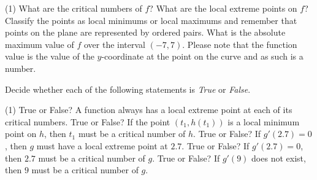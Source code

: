 \documentclass[12pt,]{book}
\theoremstyle{plain}
\theoremstyle{definition}
\numberwithin{equation}{section}
\newcounter{figstack}
\newcounter{figindex}
\newlength\fight
\newcommand\pushValignCaptionBottom[5][b]{%
\stepcounter{figstack}%
\expandafter\def\csname %
figalign\romannumeral\value{figstack}\endcsname{#1}%
\expandafter\def\csname %
figtype\romannumeral\value{figstack}\endcsname{#2}%
\expandafter\def\csname %
figwd\romannumeral\value{figstack}\endcsname{#3}%
\expandafter\def\csname %
figcontent\romannumeral\value{figstack}\endcsname{#4}%
\expandafter\def\csname %
figcap\romannumeral\value{figstack}\endcsname{#5}%
\setbox0=\hbox{%
\begin{#2}{#3}#4\end{#2}}%
\ifdim\dimexpr\ht0+\dp0\relax>\fight\global\setlength{\fight}{%
\dimexpr\ht0+\dp0\relax}\fi%
}
\newcommand\popValignCaptionBottom{%
\setcounter{figindex}{0}%
\hfill%
\whiledo{\value{figindex}<\value{figstack}}{%
\stepcounter{figindex}%
\def\tmp{\csname figwd\romannumeral\value{figindex}\endcsname}%
\begin{\csname figtype\romannumeral\value{figindex}\endcsname}[t]{\tmp}%
\centering%
\stackinset{c}{}%
{\csname figalign\romannumeral\value{figindex}\endcsname}{}%
{\csname figcontent\romannumeral\value{figindex}\endcsname}%
{\rule{0pt}{\fight}}\par%
\csname figcap\romannumeral\value{figindex}\endcsname%
\end{\csname figtype\romannumeral\value{figindex}\endcsname}%
\hfill%
}%
\setcounter{figstack}{0}%
\setlength{\fight}{0pt}%
\hfill%
}
\newcommand{\fe}[2]{#1\mathopen{}\left(#2\right)\mathclose{}}
\newcommand{\ointerval}[2]{\left(#1,#2\right)}
\newcommand{\point}[2]{\left(#1,#2\right)}
\newcommand{\fd}[1]{#1'}
\begin{document}
\par
\begin{exercisegroup}(1)
\exercise[2.]\hypertarget{exercise-564}{\null}What are the critical numbers of \(f\)?%
\exercise[3.]\hypertarget{exercise-565}{\null}What are the local extreme points on \(f\)?  Classify the points as local minimums or local maximums and remember that points on the plane are represented by ordered pairs.%
\exercise[4.]\hypertarget{exercise-566}{\null}What is the absolute maximum value of \(f\) over the interval \(\ointerval{-7}{7}\).  Please note that the function value is the value of the \(y\)-coordinate at the point on the curve and as such is a number.%
\end{exercisegroup}
\par\smallskip\noindent
Decide whether each of the following statements is \emph{True} or \emph{False}.%
\par
\begin{exercisegroup}(1)
\exercise[5.]\hypertarget{exercise-567}{\null}True or False? A function always has a local extreme point at each of its critical numbers.%
\exercise[6.]\hypertarget{exercise-568}{\null}True or False? If the point \(\point{t_1}{\fe{h}{t_1}}\) is a local minimum point on \(h\), then \(t_1\) must be a critical number of \(h\).%
\exercise[7.]\hypertarget{exercise-569}{\null}True or False? If \(\fe{\fd{g}}{2.7}=0\), then \(g\) must have a local extreme point at \(2.7\).%
\exercise[8.]\hypertarget{exercise-570}{\null}True or False? If \(\fe{\fd{g}}{2.7}=0\), then \(2.7\) must be a critical number of \(g\).%
\exercise[9.]\hypertarget{exercise-571}{\null}True or False? If \(\fe{\fd{g}}{9}\) does not exist, then \(9\) must be a critical number of \(g\).%
\end{exercisegroup}
\end{document}

